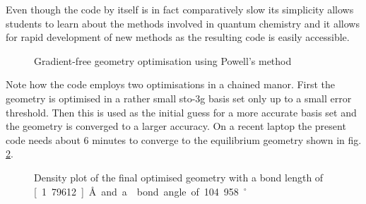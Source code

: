 Even though the code by itself is in fact comparatively slow
its simplicity allows students to learn about the methods involved
in quantum chemistry and it allows for rapid development
of new methods as the resulting code is easily accessible.

\begin{figure}
	
	\caption{Gradient-free geometry optimisation using Powell's method}
	\label{fig:codeGeoOpt}
\end{figure}

Note how the code employs two optimisations in a chained manor.
First the geometry is optimised in a rather small sto-3g basis set
only up to a small error threshold.
Then this is used as the initial guess for a more accurate basis set
and the geometry is converged to a larger accuracy.
On a recent laptop the present code needs about 6 minutes
to converge to the equilibrium geometry shown in fig. \ref{fig:OptimalGeometryWater}.


\begin{figure}
	\centering
	\caption{Density plot of the final optimised  geometry with a
	 bond length of \unit[1.79612]{\AA} and a  bond angle of \unit{104.958}{$^\circ$}}
	\label{fig:OptimalGeometryWater}
\end{figure}
